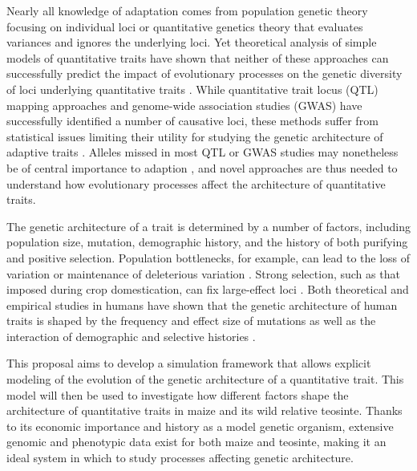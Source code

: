 Nearly all knowledge of adaptation comes from population genetic theory focusing on individual loci or quantitative genetics theory that evaluates variances and ignores the underlying loci. Yet theoretical analysis of simple models of quantitative traits have shown that neither of these approaches can successfully predict the impact of evolutionary processes on the genetic diversity of loci underlying quantitative traits \citep{Chevin:2008, LeCorre:2012co}. 
While quantitative trait locus (QTL) mapping approaches and genome-wide association studies (GWAS) have successfully identified a number of causative loci, these methods suffer from statistical issues limiting their utility for studying the genetic architecture of adaptive traits \citep{spencer2009designing,Gibson:2012,Thornton:2013}. Alleles missed in most QTL or GWAS studies may nonetheless be of central importance to adaption \citep{Rockman:2011ej, Mackay:2009}, and novel approaches are thus needed to understand how evolutionary processes affect the architecture of quantitative traits.

The genetic architecture of a trait is determined by a number of factors, including population size, mutation, demographic history, and the history of both purifying and positive selection. Population bottlenecks, for example, can lead to the loss of variation or maintenance of deleterious variation \citep[e.g.][]{Renaut:2015hi, Gunther:2010}. Strong selection, such as that imposed during crop domestication, can fix large-effect loci \citep{Brown:2011}. Both theoretical and empirical studies in humans have shown that the genetic architecture of human traits is shaped by the frequency and effect size of mutations \citep{Thornton:2013} as well as the interaction of demographic and selective histories \citep{Fu:2014jt, Gravel:2011iq, Henn:2015dp}.

This proposal aims to develop a simulation framework that allows explicit modeling of the evolution of the genetic architecture of a quantitative trait. This model will then be used to investigate how different factors shape the architecture of quantitative traits in maize and its wild relative teosinte. Thanks to its economic importance and history as a model genetic organism, extensive genomic \citep{Wright:2005,Hufford:2012dy} and phenotypic \citep{Wallace:2014,Weber:2009} data exist for both maize and teosinte, making it an ideal system in which to study processes affecting genetic architecture.  

